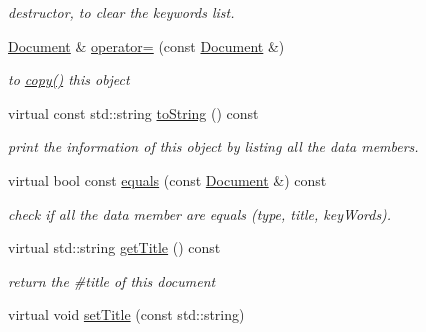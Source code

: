 \begin{DoxyCompactItemize}
\begin{DoxyCompactList}\small\item\em destructor, to clear the keywords list. \end{DoxyCompactList}\item 
\hypertarget{classdocs_1_1Document_ad7026f3128f00be0e80bb9dc7d220da4}{\hyperlink{classdocs_1_1Document}{Document} \& \hyperlink{classdocs_1_1Document_ad7026f3128f00be0e80bb9dc7d220da4}{operator=} (const \hyperlink{classdocs_1_1Document}{Document} \&)}\label{classdocs_1_1Document_ad7026f3128f00be0e80bb9dc7d220da4}

\begin{DoxyCompactList}\small\item\em to \hyperlink{classdocs_1_1Document_ad8b6a91c7a8e39a880790d14aba14322}{copy()} this object \end{DoxyCompactList}\item 
\hypertarget{classdocs_1_1Document_a16db383045038b779eb489ad125ef02b}{virtual const std\-::string \hyperlink{classdocs_1_1Document_a16db383045038b779eb489ad125ef02b}{to\-String} () const }\label{classdocs_1_1Document_a16db383045038b779eb489ad125ef02b}

\begin{DoxyCompactList}\small\item\em print the information of this object by listing all the data members. \end{DoxyCompactList}\item 
\hypertarget{classdocs_1_1Document_ad86b3a7c7d496f3b05c740e2c1433c78}{virtual bool const \hyperlink{classdocs_1_1Document_ad86b3a7c7d496f3b05c740e2c1433c78}{equals} (const \hyperlink{classdocs_1_1Document}{Document} \&) const }\label{classdocs_1_1Document_ad86b3a7c7d496f3b05c740e2c1433c78}

\begin{DoxyCompactList}\small\item\em check if all the data member are equals (type, title, key\-Words). \end{DoxyCompactList}\item 
\hypertarget{classdocs_1_1Document_a06b90f239984c69784c877d670943fb5}{virtual std\-::string \hyperlink{classdocs_1_1Document_a06b90f239984c69784c877d670943fb5}{get\-Title} () const }\label{classdocs_1_1Document_a06b90f239984c69784c877d670943fb5}

\begin{DoxyCompactList}\small\item\em return the \#title of this document \end{DoxyCompactList}\item 
\hypertarget{classdocs_1_1Document_afdf0fd42a3afe3c7c2523b3ee16d09e0}{virtual void \hyperlink{classdocs_1_1Document_afdf0fd42a3afe3c7c2523b3ee16d09e0}{set\-Title} (const std\-::string)}\label{classdocs_1_1Document_afdf0fd42a3afe3c7c2523b3ee16d09e0}


\end{DoxyCompactItemize}

